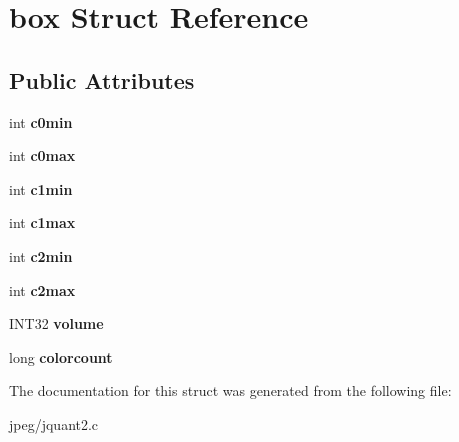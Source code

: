 \hypertarget{structbox}{}\section{box Struct Reference}
\label{structbox}
\subsection*{Public Attributes}
\begin{DoxyCompactItemize}
\item 
int {\bfseries c0min}\hypertarget{structbox_acf78968f99d9730f516003fc77a60f07}{}\label{structbox_acf78968f99d9730f516003fc77a60f07}

\item 
int {\bfseries c0max}\hypertarget{structbox_a9a9cb397dbffdd1b17cc670834e3fb4d}{}\label{structbox_a9a9cb397dbffdd1b17cc670834e3fb4d}

\item 
int {\bfseries c1min}\hypertarget{structbox_a81563b63e4a79ca40bdfeacf5070a6d9}{}\label{structbox_a81563b63e4a79ca40bdfeacf5070a6d9}

\item 
int {\bfseries c1max}\hypertarget{structbox_a5313694dbee838c7f4d5f409e954460e}{}\label{structbox_a5313694dbee838c7f4d5f409e954460e}

\item 
int {\bfseries c2min}\hypertarget{structbox_a781a101c49c5e4a789967569994d924d}{}\label{structbox_a781a101c49c5e4a789967569994d924d}

\item 
int {\bfseries c2max}\hypertarget{structbox_a1fe5b5ab81ed7e8e3f104deb168576cd}{}\label{structbox_a1fe5b5ab81ed7e8e3f104deb168576cd}

\item 
I\+N\+T32 {\bfseries volume}\hypertarget{structbox_acaba83fb8356e20d21793c23c41033a1}{}\label{structbox_acaba83fb8356e20d21793c23c41033a1}

\item 
long {\bfseries colorcount}\hypertarget{structbox_af92a3080724bf452855f631e901b803c}{}\label{structbox_af92a3080724bf452855f631e901b803c}

\end{DoxyCompactItemize}


The documentation for this struct was generated from the following file\+:\begin{DoxyCompactItemize}
\item 
jpeg/jquant2.\+c\end{DoxyCompactItemize}
